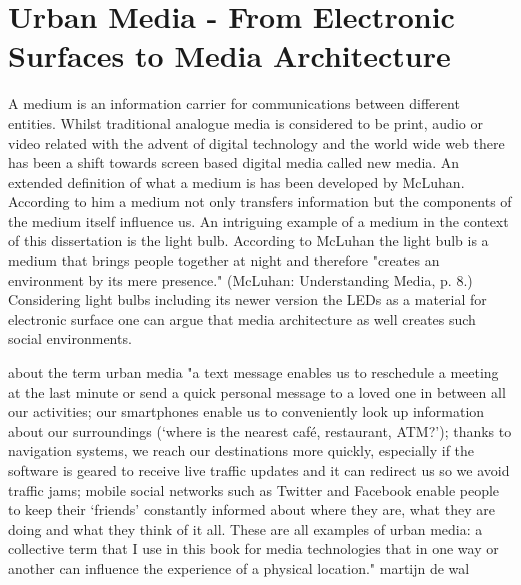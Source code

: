 
\section{Urban Media - From Electronic Surfaces to Media Architecture}



A medium is an information carrier for communications between different entities. Whilst traditional analogue media is considered to be print, audio or video related with the advent of digital technology and the world wide web there has been a shift towards screen based digital media called new media. 
An extended definition of what a medium is has been developed by McLuhan. According to him a medium not only transfers information but the components of the medium itself influence us.  
An intriguing example of a medium in the context of this dissertation is the light bulb. According to McLuhan the light bulb is a medium that brings people together at night and therefore "creates an environment by its mere presence." (McLuhan: Understanding Media, p. 8.)
Considering light bulbs including its newer version the LEDs as a material for electronic surface one can argue that media architecture as well creates such social environments.

about the term urban media "a text message enables us to reschedule a meeting at the last minute or send a quick personal message to a loved one in between all our activities; our smartphones enable us to conveniently look up information about our surroundings (‘where is the nearest café, restaurant, ATM?’); thanks to navigation systems, we reach our destinations more quickly, especially if the software is geared to receive live traffic updates and it can redirect us so we avoid traffic jams; mobile social networks such as Twitter and Facebook enable people to keep their ‘friends’ constantly informed about where they are, what they are doing and what they think of it all. These are all examples of urban media: a collective term that I use in this book for media technologies that in one way or another can influence the experience of a physical location." martijn de wal


